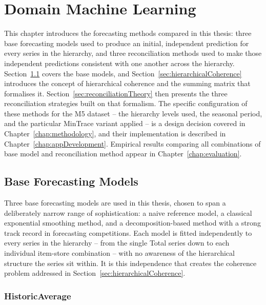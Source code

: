 %
%
%

\chapter{Domain Machine Learning}
\label{chap:domainML}

This chapter introduces the forecasting methods compared in this thesis: three base forecasting models used to produce an initial, independent prediction for every series in the hierarchy, and three reconciliation methods used to make those independent predictions consistent with one another across the hierarchy. Section~\ref{sec:baseModels} covers the base models, and Section~\ref{sec:hierarchicalCoherence} introduces the concept of hierarchical coherence and the summing matrix that formalises it. Section~\ref{sec:reconciliationTheory} then presents the three reconciliation strategies built on that formalism. The specific configuration of these methods for the M5 dataset -- the hierarchy levels used, the seasonal period, and the particular MinTrace variant applied -- is a design decision covered in Chapter~\ref{chap:methodology}, and their implementation is described in Chapter~\ref{chap:appDevelopment}. Empirical results comparing all combinations of base model and reconciliation method appear in Chapter~\ref{chap:evaluation}.

\section{Base Forecasting Models}
\label{sec:baseModels}

Three base forecasting models are used in this thesis, chosen to span a deliberately narrow range of sophistication: a naive reference model, a classical exponential smoothing method, and a decomposition-based method with a strong track record in forecasting competitions. Each model is fitted independently to every series in the hierarchy -- from the single Total series down to each individual item-store combination -- with no awareness of the hierarchical structure the series sit within. It is this independence that creates the coherence problem addressed in Section~\ref{sec:hierarchicalCoherence}.

\subsection{HistoricAverage}
\label{subsec:histAvg}

